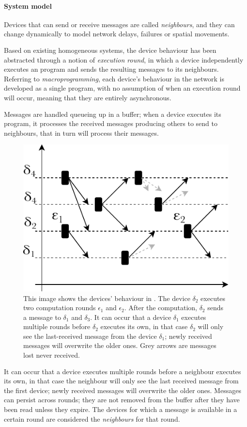\paragraph{System model}
Devices that can send or receive messages are called \emph{neighbours}, and they can change dynamically to model network
delays, failures or spatial movements.

Based on existing homogeneous systems, the device behaviour has been abstracted through a notion of \emph{execution round},
in which a device independently executes an \xc{} program and sends the resulting messages to its neighbours.
Referring to \emph{macroprogramming}, each device's behaviour in the network is developed as a single program, with no
assumption of when an execution round will occur, meaning that they are entirely asynchronous.

Messages are handled queueing up in a buffer; when a device executes its \xc{} program, it processes the received
messages producing others to send to neighbours, that in turn will process their messages.

\begin{figure}
    \centering
    \includegraphics[width=.5\linewidth]{figures/xc-system-model}
    \caption{This image shows the devices' behaviour in \xc{}.
        The device $\delta_2$ executes two computation rounds $\epsilon_1$ and $\epsilon_2$.
        After the computation, $\delta_2$ sends a message to $\delta_1$ and $\delta_3$.
        It can occur that a device $\delta_1$ executes multiple rounds before $\delta_2$ executes its own, in that case $\delta_2$ will
        only see the last-received message from the device $\delta_1$; newly received messages will overwrite the older ones.
        Grey arrows are messages lost never received.
    }
    \label{fig:xc-system-model}
\end{figure}

It can occur that a device executes multiple rounds before a neighbour executes its own, in that case the neighbour will
only see the last received message from the first device; newly received messages will overwrite the older ones.
Messages can persist across rounds; they are not removed from the buffer after they have been read unless they expire.
The devices for which a message is available in a certain round are considered the \emph{neighbours} for that round.

